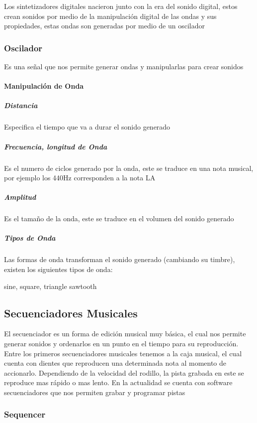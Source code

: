 Los sintetizadores digitales nacieron junto con la era del sonido digital,
estos crean sonidos por medio de la manipulación digital de las ondas
y sus propiedades, estas ondas son generadas por medio de un oscilador

\subsubsection{Oscilador}

Es una señal que nos permite generar ondas y manipularlas para crear
sonidos

\paragraph{Manipulación de Onda}
\subparagraph{Distancia}

Especifica el tiempo que va a durar el sonido generado

\subparagraph{Frecuencia, longitud de Onda}

Es el numero de ciclos generado por la onda, este se traduce en una
nota musical, por ejemplo los 440Hz corresponden a la nota LA

\subparagraph{Amplitud}

Es el tamaño de la onda, este se traduce en el volumen del
sonido generado

\subparagraph{Tipos de Onda}

Las formas de onda transforman el sonido generado (cambiando su timbre),
existen los siguientes tipos de onda:

sine, square, triangle sawtooth

\subsection{Secuenciadores Musicales}

El secuenciador es un forma de edición musical muy básica, el cual
nos permite generar sonidos y ordenarlos en un punto en el tiempo
para su reproducción. Entre los primeros secuenciadores musicales
tenemos a la caja musical, el cual cuenta con dientes que reproducen
una determinada nota al momento de accionarlo. Dependiendo
de la velocidad del rodillo, la pista grabada en este se reproduce
mas rápido o mas lento. En la actualidad se cuenta con software
secuenciadores que nos permiten grabar y programar pistas

\subsubsection{Sequencer}

